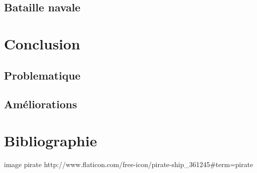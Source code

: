 \documentclass{report}
\begin{document}
\section{Bataille navale}


\chapter{Conclusion}

\section{Problematique}

\section{Améliorations}

\chapter{Bibliographie}
image pirate
http://www.flaticon.com/free-icon/pirate-ship_361245#term=pirate%
\end{document}
